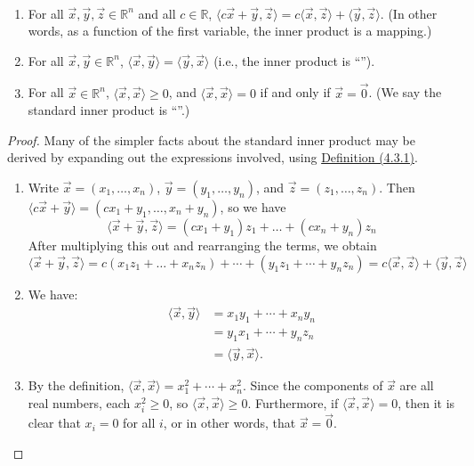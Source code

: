 \documentclass[11pt,fleqn]{book} %
\begin{document}
\setcounter{chapter}{4}
\setcounter{dummy}{2}
\begin{proposition}
{~~~}

    \begin{enumerate}[label=\alph*)]
        \item For all $\vec{x}, \vec{y}, \vec{z} \in \mathbb{R}^n$ and all $c \in \mathbb{R}$, $\langle c\vec{x} + \vec{y}, \vec{z} \rangle = c \langle \vec{x}, \vec{z} \rangle + \langle \vec{y}, \vec{z} \rangle$. (In other words, as a function of the first variable, the inner product is a  mapping.)
        \item For all $\vec{x}, \vec{y} \in \mathbb{R}^n$, $\langle \vec{x}, \vec{y} \rangle = \langle \vec{y}, \vec{x} \rangle$ (i.e., the inner product is ``'').
        \item For all $\vec{x} \in \mathbb{R}^n$, $\langle \vec{x}, \vec{x} \rangle \ge 0$, and $\langle \vec{x}, \vec{x} \rangle = 0$ if and only if $\vec{x} = \vec{0}$. (We say the standard inner product is ``''.)
    \end{enumerate}
\end{proposition}
\setcounter{chapter}{3}

\begin{proof}
    Many of the simpler facts about the standard inner product may be derived by expanding out the expressions involved, using \hyperref[Def4_3_1]{Definition (4.3.1)}.
    
    \begin{enumerate}[label=\alph*)]
        \item Write $\vec{x} = (x_1, \dots, x_n)$, $\vec{y} = (y_1, \dots, y_n)$, and $\vec{z} = (z_1, \dots, z_n)$. Then $\langle c\vec{x} + \vec{y} \rangle = (cx_1 + y_1, \dots, x_n + y_n)$, so we have $$\langle \vec{x} + \vec{y}, \vec{z} \rangle = (cx_1 + y_1)z_1 + \dots + (cx_n + y_n)z_n$$ After multiplying this out and rearranging the terms, we obtain $$\langle \vec{x} + \vec{y}, \vec{z} \rangle = c(x_1z_1 + \dots + x_nz_n)+ \cdots + (y_1z_1+ \cdots + y_nz_n) = c \langle \vec{x}, \vec{z} \rangle + \langle \vec{y}, \vec{z} \rangle$$ 

        \item We have:
        \vspace{-0.45cm} 
        \begin{align*}
            \langle \vec{x}, \vec{y} \rangle 
            &= x_1y_1 + \cdots + x_ny_n 
            \\
            &= y_1x_1 + \cdots + y_nz_n
            \\
            &= \langle \vec{y}, \vec{x} \rangle.
        \end{align*}
        
        \item By the definition, $\langle \vec{x}, \vec{x} \rangle = x_1^2 + \cdots + x_n^2$. Since the components of $\vec{x}$ are all real numbers, each $x_i^2 \ge 0$, so $\langle \vec{x}, \vec{x} \rangle \ge 0$. Furthermore, if $\langle \vec{x}, \vec{x} \rangle = 0$, then it is clear that $x_i = 0$ for all $i$, or in other words, that $\vec{x} = \vec{0}$.
    \end{enumerate}
\end{proof}
\end{document}
